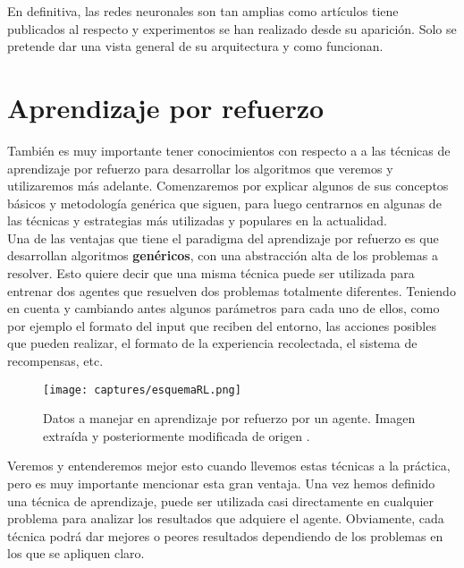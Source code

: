 \documentclass[11pt,fleqn]{book} %
\begin{document}
En definitiva, las redes neuronales son tan amplias como artículos tiene publicados al respecto y experimentos se han realizado desde su aparición. Solo se pretende dar una vista general de su arquitectura y como funcionan. \cite{article:redesNeuronalesMicrosoft} \cite{book:TFGredes}

\chapter{Aprendizaje por refuerzo}\label{sec:RL}

También es muy importante tener conocimientos con respecto a a las técnicas de aprendizaje por refuerzo para desarrollar los algoritmos que veremos y utilizaremos más adelante. Comenzaremos por explicar algunos de sus conceptos básicos y metodología genérica que siguen, para luego centrarnos en algunas de las técnicas y estrategias más utilizadas y populares en la actualidad. \\

Una de las ventajas que tiene el paradigma del aprendizaje por refuerzo es que desarrollan algoritmos \textbf{genéricos}, con una abstracción alta de los problemas a resolver. Esto quiere decir que una misma técnica puede ser utilizada para entrenar dos agentes que resuelven dos problemas totalmente diferentes. Teniendo en cuenta y cambiando antes algunos parámetros para cada uno de ellos, como por ejemplo el formato del input que reciben del entorno, las acciones posibles que pueden realizar, el formato de la experiencia recolectada, el sistema de recompensas, etc. \\

\begin{figure}[H]
	\centering\texttt{[image: captures/esquemaRL.png]}
	\caption{Datos a manejar en aprendizaje por refuerzo por un agente. Imagen extraída y posteriormente modificada de origen \cite{article:RLwikipedia}.}
	\label{fig:esquemaRL} %
\end{figure}

Veremos y entenderemos mejor esto cuando llevemos estas técnicas a la práctica, pero es muy importante mencionar esta gran ventaja. Una vez hemos definido una técnica de aprendizaje, puede ser utilizada casi directamente en cualquier problema para analizar los resultados que adquiere el agente. Obviamente, cada técnica podrá dar mejores o peores resultados dependiendo de los problemas en los que se apliquen claro. \\
\end{document}
